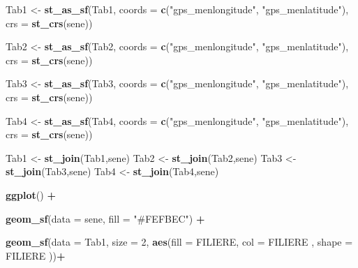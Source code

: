\documentclass[
]{article}
\newenvironment{Shaded}{\begin{snugshade}}{\end{snugshade}}
\newcommand{\AttributeTok}[1]{\textcolor[rgb]{0.13,0.29,0.53}{#1}}
\newcommand{\DecValTok}[1]{\textcolor[rgb]{0.00,0.00,0.81}{#1}}
\newcommand{\FunctionTok}[1]{\textcolor[rgb]{0.13,0.29,0.53}{\textbf{#1}}}
\newcommand{\NormalTok}[1]{#1}
\newcommand{\OtherTok}[1]{\textcolor[rgb]{0.56,0.35,0.01}{#1}}
\newcommand{\SpecialCharTok}[1]{\textcolor[rgb]{0.81,0.36,0.00}{\textbf{#1}}}
\newcommand{\StringTok}[1]{\textcolor[rgb]{0.31,0.60,0.02}{#1}}
\begin{document}
\begin{Shaded}
\begin{Highlighting}[]
\NormalTok{Tab1 }\OtherTok{\textless{}{-}} \FunctionTok{st\_as\_sf}\NormalTok{(Tab1, }\AttributeTok{coords =} \FunctionTok{c}\NormalTok{(}\StringTok{"gps\_menlongitude"}\NormalTok{, }\StringTok{"gps\_menlatitude"}\NormalTok{), }\AttributeTok{crs =} \FunctionTok{st\_crs}\NormalTok{(sene))}



\NormalTok{Tab2 }\OtherTok{\textless{}{-}} \FunctionTok{st\_as\_sf}\NormalTok{(Tab2, }\AttributeTok{coords =} \FunctionTok{c}\NormalTok{(}\StringTok{"gps\_menlongitude"}\NormalTok{, }\StringTok{"gps\_menlatitude"}\NormalTok{), }\AttributeTok{crs =} \FunctionTok{st\_crs}\NormalTok{(sene))}



\NormalTok{Tab3 }\OtherTok{\textless{}{-}} \FunctionTok{st\_as\_sf}\NormalTok{(Tab3, }\AttributeTok{coords =} \FunctionTok{c}\NormalTok{(}\StringTok{"gps\_menlongitude"}\NormalTok{, }\StringTok{"gps\_menlatitude"}\NormalTok{), }\AttributeTok{crs =} \FunctionTok{st\_crs}\NormalTok{(sene))}



\NormalTok{Tab4 }\OtherTok{\textless{}{-}} \FunctionTok{st\_as\_sf}\NormalTok{(Tab4, }\AttributeTok{coords =} \FunctionTok{c}\NormalTok{(}\StringTok{"gps\_menlongitude"}\NormalTok{, }\StringTok{"gps\_menlatitude"}\NormalTok{), }\AttributeTok{crs =} \FunctionTok{st\_crs}\NormalTok{(sene))}



\NormalTok{Tab1 }\OtherTok{\textless{}{-}} \FunctionTok{st\_join}\NormalTok{(Tab1,sene)}
\NormalTok{Tab2 }\OtherTok{\textless{}{-}} \FunctionTok{st\_join}\NormalTok{(Tab2,sene)}
\NormalTok{Tab3 }\OtherTok{\textless{}{-}} \FunctionTok{st\_join}\NormalTok{(Tab3,sene)}
\NormalTok{Tab4 }\OtherTok{\textless{}{-}} \FunctionTok{st\_join}\NormalTok{(Tab4,sene)}



\FunctionTok{ggplot}\NormalTok{() }\SpecialCharTok{+}
  
  \FunctionTok{geom\_sf}\NormalTok{(}\AttributeTok{data =}\NormalTok{ sene, }\AttributeTok{fill =} \StringTok{"\#FEFBEC"}\NormalTok{) }\SpecialCharTok{+}
  
  \FunctionTok{geom\_sf}\NormalTok{(}\AttributeTok{data =}\NormalTok{ Tab1, }\AttributeTok{size =} \DecValTok{2}\NormalTok{, }\FunctionTok{aes}\NormalTok{(}\AttributeTok{fill =}\NormalTok{ FILIERE, }\AttributeTok{col =}\NormalTok{ FILIERE , }\AttributeTok{shape =}\NormalTok{ FILIERE  ))}\SpecialCharTok{+}
  

\end{Highlighting}
\end{Shaded}
\end{document}
